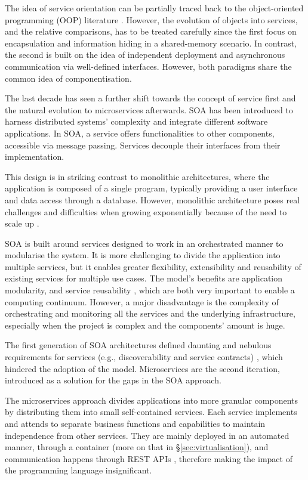 The idea of service orientation can be partially traced back to the object-oriented programming (OOP) literature \cite{microservices-today}. However, the evolution of objects into services, and the relative comparisons, has to be treated carefully since the first focus on encapsulation and information hiding in a shared-memory scenario. In contrast, the second is built on the idea of independent deployment and asynchronous communication via well-defined interfaces. However, both paradigms share the common idea of componentisation.

The last decade has seen a further shift towards the concept of service first and the natural evolution to microservices afterwards. SOA has been introduced to harness distributed systems' complexity and integrate different software applications. In SOA, a service offers functionalities to other components, accessible via message passing. Services decouple their interfaces from their implementation.

This design is in striking contrast to monolithic architectures, where the application is composed of a single program, typically providing a user interface and data access through a database. However, monolithic architecture poses real challenges and difficulties when growing exponentially because of the need to scale up \cite{microservices-today}.

SOA is built around services designed to work in an orchestrated manner to modularise the system. It is more challenging to divide the application into multiple services, but it enables greater flexibility, extensibility and reusability of existing services for multiple use cases. The model's benefits are application modularity, and service reusability \cite{cloud-to-thing}, which are both very important to enable a computing continuum. However, a major disadvantage is the complexity of orchestrating and monitoring all the services and the underlying infrastructure, especially when the project is complex and the components' amount is huge.

The first generation of SOA architectures defined daunting and nebulous requirements for services (e.g., discoverability and service contracts) \cite{microservices-today}, which hindered the adoption of the model. Microservices are the second iteration, introduced as a solution for the gaps in the SOA approach.

The microservices approach divides applications into more granular components by distributing them into small self-contained services. Each service implements and attends to separate business functions and capabilities to maintain independence from other services. They are mainly deployed in an automated manner, through a container (more on that in §\ref{sec:virtualisation}), and communication happens through REST APIs \cite{rest}, therefore making the impact of the programming language insignificant.

